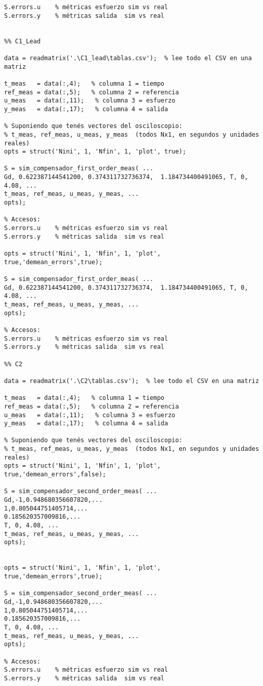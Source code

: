 \begin{lstlisting}[style=matlabstyle,caption={Script utilizado para la comparación de las simulaciones con las mediciones de los compensadores.},label={matlab:calculo1}]
% Accesos:
S.errors.u    % métricas esfuerzo sim vs real
S.errors.y    % métricas salida  sim vs real


%% C1_Lead

data = readmatrix('.\C1_lead\tablas.csv');  % lee todo el CSV en una matriz

t_meas   = data(:,4);   % columna 1 = tiempo
ref_meas = data(:,5);   % columna 2 = referencia
u_meas   = data(:,11);   % columna 3 = esfuerzo
y_meas   = data(:,17);   % columna 4 = salida

% Suponiendo que tenés vectores del osciloscopio:
% t_meas, ref_meas, u_meas, y_meas  (todos Nx1, en segundos y unidades reales)
opts = struct('Nini', 1, 'Nfin', 1, 'plot', true);

S = sim_compensador_first_order_meas( ...
Gd, 0.622387144541200, 0.374311732736374,  1.184734400491065, T, 0, 4.08, ...
t_meas, ref_meas, u_meas, y_meas, ...
opts);

% Accesos:
S.errors.u    % métricas esfuerzo sim vs real
S.errors.y    % métricas salida  sim vs real

opts = struct('Nini', 1, 'Nfin', 1, 'plot', true,'demean_errors',true);

S = sim_compensador_first_order_meas( ...
Gd, 0.622387144541200, 0.374311732736374,  1.184734400491065, T, 0, 4.08, ...
t_meas, ref_meas, u_meas, y_meas, ...
opts);

% Accesos:
S.errors.u    % métricas esfuerzo sim vs real
S.errors.y    % métricas salida  sim vs real

%% C2

data = readmatrix('.\C2\tablas.csv');  % lee todo el CSV en una matriz

t_meas   = data(:,4);   % columna 1 = tiempo
ref_meas = data(:,5);   % columna 2 = referencia
u_meas   = data(:,11);   % columna 3 = esfuerzo
y_meas   = data(:,17);   % columna 4 = salida

% Suponiendo que tenés vectores del osciloscopio:
% t_meas, ref_meas, u_meas, y_meas  (todos Nx1, en segundos y unidades reales)
opts = struct('Nini', 1, 'Nfin', 1, 'plot', true,'demean_errors',false);

S = sim_compensador_second_order_meas( ...
Gd,-1,0.948680356607820,...
1,0.805044751405714,...
0.185620357009816,...
T, 0, 4.08, ...
t_meas, ref_meas, u_meas, y_meas, ...
opts);


opts = struct('Nini', 1, 'Nfin', 1, 'plot', true,'demean_errors',true);

S = sim_compensador_second_order_meas( ...
Gd,-1,0.948680356607820,...
1,0.805044751405714,...
0.185620357009816,...
T, 0, 4.08, ...
t_meas, ref_meas, u_meas, y_meas, ...
opts);

% Accesos:
S.errors.u    % métricas esfuerzo sim vs real
S.errors.y    % métricas salida  sim vs real
\end{lstlisting}

